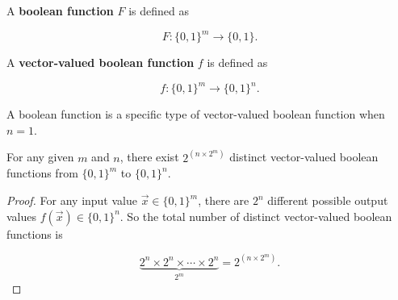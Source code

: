 \begin{definition}
A \textbf{boolean function} $F$ is defined as

$$
F:\{0,1\}^m \rightarrow\{0,1\}.
$$

A \textbf{vector-valued boolean function} $f$ is defined as

$$
f:\{0,1\}^m \rightarrow\{0,1\}^n.
$$
\end{definition}

A boolean function is a specific type of vector-valued boolean function when $n=1$. 

\begin{remark}
For any given $m$ and $n$, there exist $2^{(n \times 2^m)}$ distinct vector-valued boolean functions from $\{0,1\}^m$ to $\{0,1\}^n$.
\end{remark}

\begin{proof}
For any input value $\vec{x} \in \{0,1\}^m$, there are $2^n$ different possible output values $f(\vec{x}) \in \{0,1\}^n$. So the total number of distinct vector-valued boolean functions is 

$$
\underbrace{2^n \times 2^n \times \cdots \times 2^n}_{2^m}=2^{\left(n \times 2^m\right)}.
$$
\end{proof}